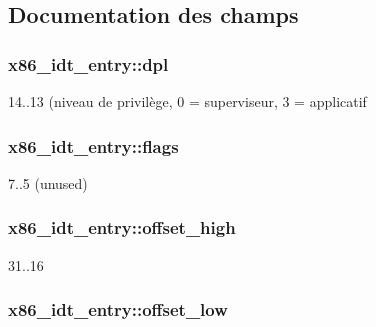 \subsection{Documentation des champs}
\hypertarget{structx86__idt__entry_a5c0f7af9139df1e94d0c6d17dcd0fb66}{
\subsubsection[{dpl}]{ x86\+\_\+idt\+\_\+entry\+::dpl}}\label{structx86__idt__entry_a5c0f7af9139df1e94d0c6d17dcd0fb66}
14..13 (niveau de privilège, 0 = superviseur, 3 = applicatif \hypertarget{structx86__idt__entry_af0ce23f490bcc54f41c3710ab6433786}{
\subsubsection[{flags}]{ x86\+\_\+idt\+\_\+entry\+::flags}}\label{structx86__idt__entry_af0ce23f490bcc54f41c3710ab6433786}
7..5 (unused) \hypertarget{structx86__idt__entry_a0206c9a35f101b3cc450fce405df1c0e}{
\subsubsection[{offset\+\_\+high}]{ x86\+\_\+idt\+\_\+entry\+::offset\+\_\+high}}\label{structx86__idt__entry_a0206c9a35f101b3cc450fce405df1c0e}
31..16 \hypertarget{structx86__idt__entry_a7efe04d7c37c746487da6d2ae5349525}{
\subsubsection[{offset\+\_\+low}]{ x86\+\_\+idt\+\_\+entry\+::offset\+\_\+low}}\label{structx86__idt__entry_a7efe04d7c37c746487da6d2ae5349525}
